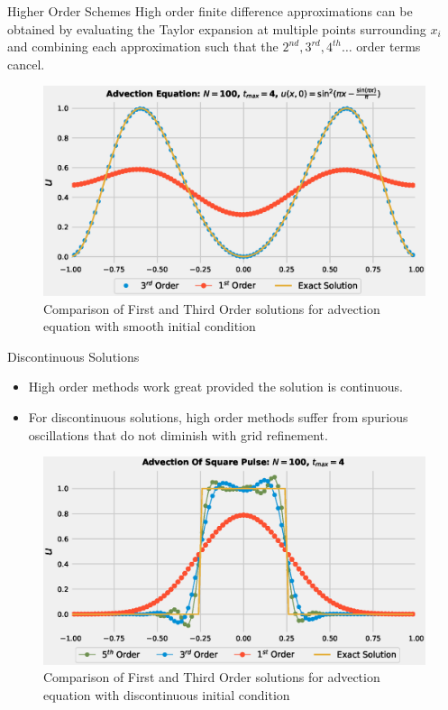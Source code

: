\documentclass[9pt]{beamer}
\begin{document}
\begin{frame}{Higher Order Schemes
  }
  High order finite difference approximations can be obtained by evaluating the Taylor expansion at multiple points surrounding $x_i$ and combining each approximation such that the $2^{nd}, 3^{rd}, 4^{th} \dots $ order terms cancel.  

    \begin{figure}[H]
      \centering
      \includegraphics[scale=0.45]{AdvectionHighOrderComparison.eps}\caption{Comparison of First and Third Order solutions for advection equation with smooth initial condition}
        \label{fig:First/HighOrderComparison}
      \end{figure}

\end{frame}

\begin{frame}{Discontinuous Solutions}
  \begin{itemize}
    \item High order methods work great provided the solution is continuous. 
    \item For discontinuous solutions, high order methods suffer from spurious oscillations that do not diminish with grid refinement.
  \end{itemize}

  
  \begin{figure}[H]
    \centering
    \includegraphics[scale=0.45]{AdvectionHighOrderComparison_pulse.eps}\caption{Comparison of First and Third Order solutions for advection equation with discontinuous initial condition}
      \label{fig:First/HighOrderComparison_pulse}
    \end{figure}
\end{frame}
\end{document}
